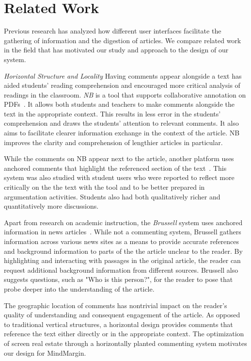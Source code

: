 \section{Related Work}

Previous research has analyzed how different user interfaces facilitate the gathering of information and the digestion of articles. We compare related work in the field that has motivated our study and approach to the design of our system.
 
\textit{Horizontal Structure and Locality}
Having comments appear alongside a text has aided students’ reading comprehension and encouraged more critical analysis of readings in the classroom. \textit{NB} is a tool that supports collaborative annotation on PDFs~\cite{NB}. It allows both students and teachers to make comments alongside the text in the appropriate context. This results in less error in the students’ comprehension and draws the students’ attention to relevant comments. It also aims to facilitate clearer information exchange in the context of the article. NB improves the clarity and comprehension of lengthier articles in particular. 

While the comments on NB appear next to the article, another platform uses anchored comments that highlight the referenced section of the text~\cite{AnnotationsStudents}. This system was also studied with student users who were reported to reflect more critically on the the text with the tool and to be better prepared in argumentation activities. Students also had both qualitatively richer and quantitatively more discussions.

Apart from research on academic instruction, the \textit{Brussell} system uses anchored information in news articles~\cite{NewsInterfaces}. While not a commenting system, Brussell gathers information across various news sites as a means to provide accurate references and background information to parts of the the article unclear to the reader. By highlighting and interacting with passages in the original article, the reader can request additional background information from different sources. Brussell also suggests questions, such as "Who is this person?", for the reader to pose that probe deeper into the understanding of the article.

The geographic location of comments has nontrivial impact on the reader’s quality of understanding and consequent engagement of the article. As opposed to traditional vertical structures, a horizontal design provides comments that reference the text either directly or in the appropriate context. The optimization of screen real estate through a horizontally planted commenting system motivates our design for MindMargin.


